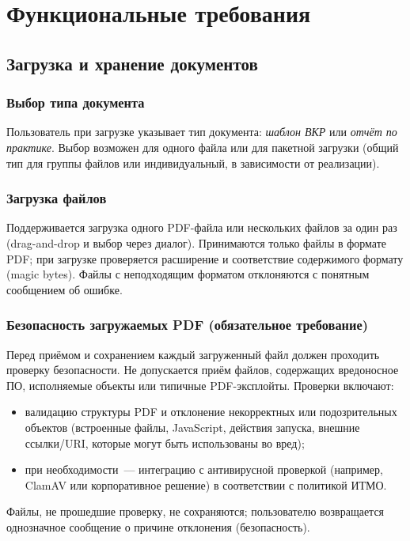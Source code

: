 \section{Функциональные требования}

\subsection{Загрузка и хранение документов}

\subsubsection{Выбор типа документа}
Пользователь при загрузке указывает тип документа: \emph{шаблон ВКР} или \emph{отчёт по практике}. Выбор возможен для одного файла или для пакетной загрузки (общий тип для группы файлов или индивидуальный, в зависимости от реализации).

\subsubsection{Загрузка файлов}
Поддерживается загрузка одного PDF-файла или нескольких файлов за один раз (drag-and-drop и выбор через диалог). Принимаются только файлы в формате PDF; при загрузке проверяется расширение и соответствие содержимого формату (magic bytes). Файлы с неподходящим форматом отклоняются с понятным сообщением об ошибке.

\subsubsection{Безопасность загружаемых PDF (обязательное требование)}
Перед приёмом и сохранением каждый загруженный файл должен проходить проверку безопасности. Не допускается приём файлов, содержащих вредоносное ПО, исполняемые объекты или типичные PDF-эксплойты. Проверки включают:
\begin{itemize}
  \item валидацию структуры PDF и отклонение некорректных или подозрительных объектов (встроенные файлы, JavaScript, действия запуска, внешние ссылки/URI, которые могут быть использованы во вред);
  \item при необходимости~--- интеграцию с антивирусной проверкой (например, ClamAV или корпоративное решение) в соответствии с политикой ИТМО.
\end{itemize}
Файлы, не прошедшие проверку, не сохраняются; пользователю возвращается однозначное сообщение о причине отклонения (безопасность).

